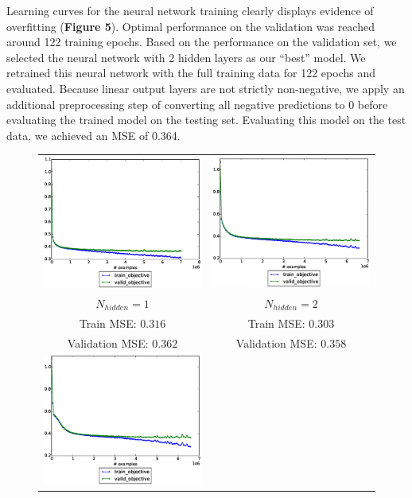 \documentclass[12pt] {article}
\renewcommand{\baselinestretch}{1.2} %
\begin{document}
Learning curves for the neural network training clearly displays evidence of overfitting (\textbf{Figure 5}). Optimal performance on the validation was reached around 122 training epochs. Based on the performance on the validation set, we selected the neural network with 2 hidden layers as our ``best'' model. We retrained this neural network with the full training data for 122 epochs and evaluated. Because linear output layers are not strictly non-negative, we apply an additional preprocessing step of converting all negative predictions to 0 before evaluating the trained model on the testing set. Evaluating this model on the test data, we achieved an MSE of 0.364.
\renewcommand{\baselinestretch}{1.0} %
\begin{figure}[h!] \centering
\begin{tabular}{cc}
\includegraphics[trim = 0mm 20mm 0mm 10mm, clip=true, width=.45\textwidth]{figdir/nn_mse_1.eps} &
\includegraphics[trim = 0mm 20mm 0mm 10mm, clip=true, width=.45\textwidth]{figdir/nn_mse_2.eps} \\
$N_{hidden}=1$ & $N_{hidden}=2$ \\
Train MSE: $0.316$ & Train MSE: $0.303$ \\
Validation MSE: $0.362$ & Validation MSE: $0.358$ \\
\includegraphics[trim = 0mm 20mm 0mm 10mm, clip=true, width=.45\textwidth]{figdir/nn_mse_3.eps} &

\end{tabular}
\end{figure}
\end{document}
